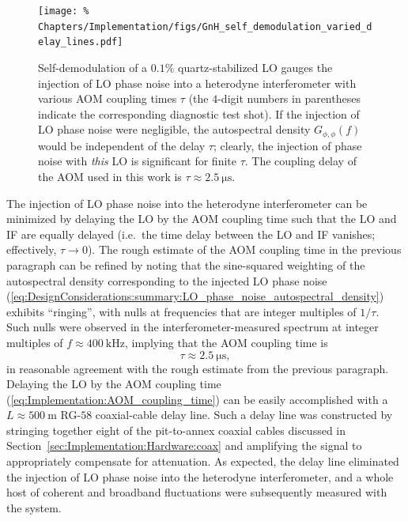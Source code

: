 \begin{figure}
  \centering
  \texttt{[image: \%
    Chapters/Implementation/figs/GnH\_self\_demodulation\_varied\_delay\_lines.pdf]}
  \caption[Self-demodulation of a $0.1\%$ quartz-stabilized LO]{%
    Self-demodulation of a $0.1\%$ quartz-stabilized LO
    gauges the injection of LO phase noise
    into a heterodyne interferometer
    with various AOM coupling times $\tau$
    (the $4$-digit numbers in parentheses indicate
    the corresponding diagnostic test shot).
    If the injection of LO phase noise were negligible,
    the autospectral density $G_{\phi,\phi}(f)$
    would be independent of the delay $\tau$;
    clearly, the injection of phase noise with \emph{this} LO
    is significant for finite $\tau$.
    The coupling delay of the AOM used in this work is
    $\tau \approx \SI{2.5}{\micro\second}$.
  }
\label{fig:Implementation:GnH_self_demodulation}
\end{figure}

The injection of LO phase noise into the heterodyne interferometer
can be minimized by delaying the LO by the AOM coupling time
such that the LO and IF are equally delayed
(i.e.\ the time delay between the LO and IF vanishes;
effectively, $\tau \rightarrow 0$).
The rough estimate of the AOM coupling time in the previous paragraph
can be refined by noting that the sine-squared weighting
of the autospectral density corresponding to the injected LO phase noise
(\ref{eq:DesignConsiderations:summary:LO_phase_noise_autospectral_density})
exhibits ``ringing'', with nulls at
frequencies that are integer multiples of $1 / \tau$.
Such nulls were observed in the interferometer-measured spectrum
at integer multiples of $f \approx \SI{400}{\kilo\hertz}$,
implying that the AOM coupling time is
\begin{equation}
  \tau \approx \SI{2.5}{\micro\second},
  \label{eq:Implementation:AOM_coupling_time}
\end{equation}
in reasonable agreement with the rough estimate
from the previous paragraph.
Delaying the LO by the AOM coupling time
(\ref{eq:Implementation:AOM_coupling_time})
can be easily accomplished with
a $L \approx \SI{500}{\meter}$ {RG-$58$} coaxial-cable delay line.
Such a delay line was constructed by
stringing together eight of the pit-to-annex coaxial cables discussed in
Section~\ref{sec:Implementation:Hardware:coax} and
amplifying the signal to appropriately compensate for attenuation.
As expected, the delay line eliminated the injection of LO phase noise
into the heterodyne interferometer, and
a whole host of coherent and broadband fluctuations
were subsequently measured with the system.

